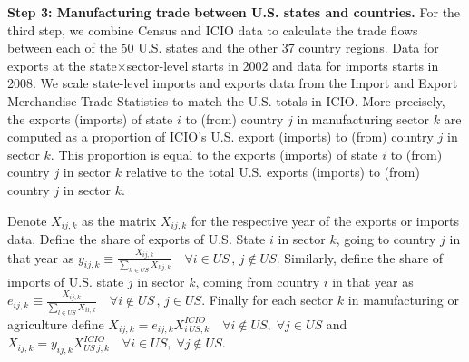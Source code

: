 \documentclass[12pt]{article}
\begin{document}
\textbf{Step 3: Manufacturing trade between U.S. states and countries.} For the third step, we combine Census and ICIO data to calculate the trade flows between each of the 50 U.S. states and the other 37 country regions. Data for exports at the state$\times$sector-level starts in 2002 and data for imports starts in 2008. We scale state-level imports and exports data from the Import and Export Merchandise Trade Statistics to match the U.S. totals in ICIO. More precisely, the exports (imports) of state $i$ to (from) country $j$ in manufacturing sector $k$ are computed as a proportion of ICIO's U.S. export (imports) to (from) country $j$ in sector $k$. This proportion is equal to the exports (imports) of state $i$ to (from) country $j$ in sector $k$ relative to the total U.S. exports (imports) to (from) country $j$ in sector $k$.

Denote $X_{ij,k}$ as the matrix $X_{ij,k}$ for the respective year of the exports or imports data. Define the share of exports of U.S. State $i$ in sector $k$, going to country $j$ in that year as $y_{ij,k}\equiv\tfrac{X_{ij,k}}{\sum_{h\in US}X_{hj,k}} \quad \forall i\in US \, , \, j\notin US.$ Similarly, define the share of imports of U.S. state $j$ in sector $k$, coming from country $i$ in that year as $e_{ij,k}\equiv\tfrac{X_{ij,k}}{\sum_{l\in US}X_{il,k}} \quad \forall i\notin US \, , \, j\in US.$ Finally for each sector $k$ in manufacturing or agriculture define $X_{ij,k}= e_{ij,k}X_{i\,US,k}^{ICIO} \quad \forall i\notin US, \; \forall j\in US$ and $X_{ij,k}=y_{ij,k}X_{US\,j,k}^{ICIO} \quad \forall i\in US, \; \forall j\notin US$.
\end{document}
